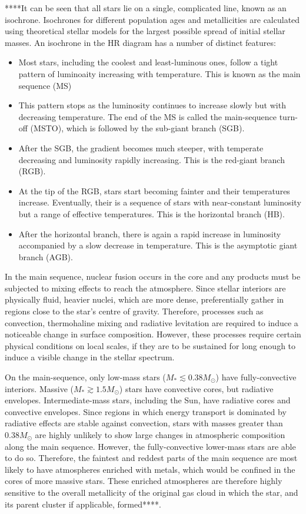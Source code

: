 \documentclass[12pt, a4paper]{report}
\begin{document}
****It can be seen that all stars lie on a single, complicated line, known as an isochrone. Isochrones for different population ages and metallicities are calculated using theoretical stellar models for the largest possible spread of initial stellar masses. An isochrone in the HR diagram has a number of distinct features:
\begin{itemize}
\item Most stars, including the coolest and least-luminous ones, follow a tight pattern of luminoaity increasing with temperature. This is known as the main sequence (MS)
\item This pattern stops as the luminosity continues to increase slowly but with decreasing temperature. The end of the MS is called the main-sequence turn-off (MSTO), which is followed by the sub-giant branch (SGB).
\item After the SGB, the gradient becomes much steeper, with temperate decreasing and luminosity rapidly increasing. This is the red-giant branch (RGB).
\item At the tip of the RGB, stars start becoming fainter and their temperatures increase. Eventually, their is a sequence of stars with near-constant luminosity but a range of effective temperatures. This is the horizontal branch (HB).
\item After the horizontal branch, there is again a rapid increase in luminosity accompanied by a slow decrease in temperature. This is the asymptotic giant branch (AGB).
\end{itemize}

In the main sequence, nuclear fusion occurs in the core and any products must be subjected to mixing effects to reach the atmosphere. Since stellar interiors are physically fluid, heavier nuclei, which are more dense, preferentially gather in regions close to the star's centre of gravity. Therefore, processes such as convection, thermohaline mixing and radiative levitation are required to induce a noticeable change in surface composition. However, these processes require certain physical conditions on local scales, if they are to be sustained for long enough to induce a visible change in the stellar spectrum.

On the main-sequence, only low-mass stars ($M_{*} \lesssim 0.38M_{\odot}$) \citep{2018A&A...619A.177B} have fully-convective interiors. Massive ($M_{*} \gtrsim 1.5M_{\odot}$) stars have convective cores, but radiative envelopes. Intermediate-mass stars, including the Sun, have radiative cores and convective envelopes. Since regions in which energy transport is dominated by radiative effects are stable against convection, stars with masses greater than $0.38M_{\odot}$ are highly unlikely to show large changes in atmospheric composition along the main sequence. However, the fully-convective lower-mass stars are able to do so. Therefore, the faintest and reddest parts of the main sequence are most likely to have atmospheres enriched with metals, which would be confined in the cores of more massive stars. These enriched atmospheres are therefore highly sensitive to the overall metallicity of the original gas cloud in which the star, and its parent cluster if applicable, formed****.
\end{document}
